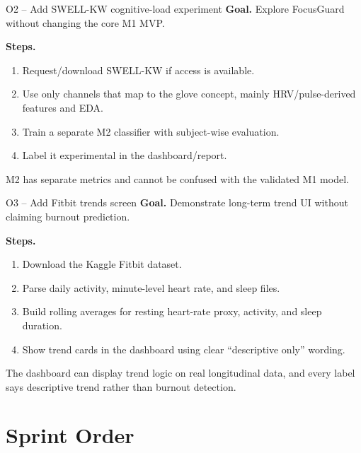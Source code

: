 \documentclass[11pt,a4paper]{article}
\begin{document}
\begin{taskbox}{O2 -- Add SWELL-KW cognitive-load experiment}
\textbf{Goal.} Explore FocusGuard without changing the core M1 MVP.

\textbf{Steps.}
\begin{enumerate}
\item Request/download SWELL-KW if access is available.
\item Use only channels that map to the glove concept, mainly HRV/pulse-derived features and EDA.
\item Train a separate M2 classifier with subject-wise evaluation.
\item Label it experimental in the dashboard/report.
\end{enumerate}

\begin{donebox}
M2 has separate metrics and cannot be confused with the validated M1 model.
\end{donebox}
\end{taskbox}

\begin{taskbox}{O3 -- Add Fitbit trends screen}
\textbf{Goal.} Demonstrate long-term trend UI without claiming burnout prediction.

\textbf{Steps.}
\begin{enumerate}
\item Download the Kaggle Fitbit dataset.
\item Parse daily activity, minute-level heart rate, and sleep files.
\item Build rolling averages for resting heart-rate proxy, activity, and sleep duration.
\item Show trend cards in the dashboard using clear ``descriptive only'' wording.
\end{enumerate}

\begin{donebox}
The dashboard can display trend logic on real longitudinal data, and every label says descriptive trend rather than burnout detection.
\end{donebox}
\end{taskbox}

\section{Sprint Order}
\end{document}
